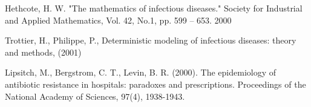 \begin{thebibliography}{99}

Hethcote, H. W. "The mathematics of infectious diseases." Society for Industrial and Applied Mathematics, Vol. 42, No.1, pp. 599 – 653. 2000

Trottier, H., Philippe, P., Deterministic modeling of infectious diseases: theory and methods, (2001)

Lipsitch, M., Bergstrom, C. T., Levin, B. R. (2000). The epidemiology of antibiotic resistance in hospitals: paradoxes and prescriptions. Proceedings of the National Academy of Sciences, 97(4), 1938-1943.

\end{thebibliography}


